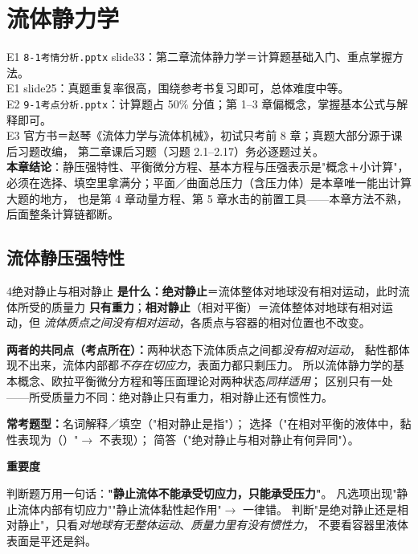 \chapter{流体静力学}

\begin{yijubox}
E1 \texttt{8-1考情分析.pptx} slide33：第二章流体静力学＝计算题基础入门、重点掌握方法。\\
E1 slide25：真题重复率很高，围绕参考书复习即可，总体难度中等。\\
E2 \texttt{9-1考点分析.pptx}：计算题占 50\% 分值；第 1--3 章偏概念，掌握基本公式与解释即可。\\
E3 官方书＝赵琴《流体力学与流体机械》，初试只考前 8 章；真题大部分源于课后习题改编，
第二章课后习题（习题 2.1--2.17）务必逐题过关。\\
\textbf{本章结论}：静压强特性、平衡微分方程、基本方程与压强表示是"概念＋小计算"，
必须在选择、填空里拿满分；平面／曲面总压力（含压力体）是本章唯一能出计算大题的地方，
也是第 4 章动量方程、第 5 章水击的前置工具——本章方法不熟，后面整条计算链都断。
\end{yijubox}

\section{流体静压强特性}

\begin{kaodian}{4}{绝对静止与相对静止}
\textbf{是什么：}\textbf{绝对静止}＝流体整体对地球没有相对运动，此时流体所受的质量力
\textbf{只有重力}；\textbf{相对静止}（相对平衡）＝流体整体对地球有相对运动，但
\emph{流体质点之间没有相对运动}，各质点与容器的相对位置也不改变。

\textbf{两者的共同点（考点所在）：}两种状态下流体质点之间都\emph{没有相对运动}，
黏性都体现不出来，流体内部都\emph{不存在切应力}，表面力都只剩压力。
所以流体静力学的基本概念、欧拉平衡微分方程和等压面理论对两种状态\emph{同样适用}；
区别只有一处——所受质量力不同：绝对静止只有重力，相对静止还有惯性力。

\textbf{常考题型：}名词解释／填空（"相对静止是指\underline{\hspace{3cm}}"）；
选择（"在相对平衡的液体中，黏性表现为（\quad）"$\to$ 不表现）；
简答（"绝对静止与相对静止有何异同"）。

\textbf{重要度 }\quad{}\quad{}

\begin{banfa}
判断题万用一句话：\textbf{"静止流体不能承受切应力，只能承受压力"}。
凡选项出现"静止流体内部有切应力""静止流体黏性起作用"$\to$ 一律错。
判断"是绝对静止还是相对静止"，只看\emph{对地球有无整体运动}、\emph{质量力里有没有惯性力}，
不要看容器里液体表面是平还是斜。
\end{banfa}
\end{kaodian}

